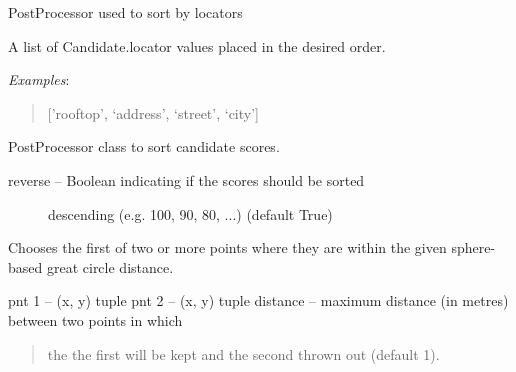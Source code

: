 \documentclass[letterpaper,10pt,english]{sphinxmanual}
\begin{document}
\begin{fulllineitems}
\label{index:omgeo.processors.postprocessors.LocatorSorter}
PostProcessor used to sort by locators

\begin{fulllineitems}
\label{index:omgeo.processors.postprocessors.LocatorSorter.ordered_locators}
A list of Candidate.locator values placed in the desired order.

\emph{Examples}:
\begin{quote}

{[}'rooftop', `address', `street', `city'{]}
\end{quote}

\end{fulllineitems}


\end{fulllineitems}


\begin{fulllineitems}
\label{index:omgeo.processors.postprocessors.ScoreSorter}
PostProcessor class to sort candidate scores.
\begin{description}
\item[{reverse  --  Boolean indicating if the scores should be sorted }] \leavevmode
descending (e.g. 100, 90, 80, ...) (default True)

\end{description}

\end{fulllineitems}


\begin{fulllineitems}
\label{index:omgeo.processors.postprocessors.SnapPoints}
Chooses the first of two or more points where they are within the given
sphere-based great circle distance.

pnt 1       -- (x, y) tuple
pnt 2       -- (x, y) tuple    
distance    -- maximum distance (in metres) between two points in which
\begin{quote}

the the first will be kept and the second thrown out
(default 1).
\end{quote}

\end{fulllineitems}
\end{document}
